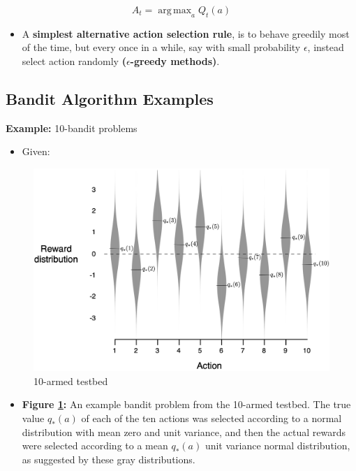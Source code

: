 \documentclass[12pt, a4paper]{article}
\DeclareMathOperator*{\argmax}{arg\,max} %
\begin{document}
\[A_t = \argmax_{a}Q_t(a)\]

\begin{itemize}
\item
  A \textbf{simplest alternative action selection rule}, is to behave
  greedily most of the time, but every once in a while, say with small
  probability \(\epsilon\), instead select action randomly
  \textbf{(\(\epsilon\)-greedy methods)}.
\end{itemize}







\subsection{Bandit Algorithm Examples }\label{bandit-algorithm-examples}

\textbf{Example:} 10-bandit problems

\begin{itemize}
\item Given:
\end{itemize}

\begin{figure}[H]
  \centering  %
    \includegraphics[width=0.9\columnwidth]{images/10-armed-eg1.png}
    \caption{10-armed testbed}
    \label{fig:fig1}
\end{figure}

\begin{itemize}
\item
  \textbf{Figure \ref{fig:fig1}:} An example bandit problem from the 10-armed
  testbed. The true value \(q_*(a)\) of each of the ten actions was
  selected according to a normal distribution with mean zero and unit
  variance, and then the actual rewards were selected according to a
  mean \(q_*(a)\) unit variance normal distribution, as suggested by
  these gray distributions.
\end{itemize}
\end{document}
